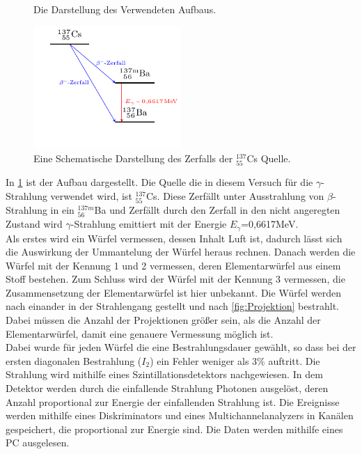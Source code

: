 \begin{figure}[h!]
\centering
\caption{Die Darstellung des Verwendeten Aufbaus.}\label{fig:Aufbau}
\end{figure}
\begin{figure}[h!]
	\centering
	\includegraphics[width = 0.5\textwidth]{../Grafiken/Tikz/tikz-Energieschema.pdf}
	\caption{Eine Schematische Darstellung des Zerfalls der ${}^{137}_{55}$Cs Quelle.}
\end{figure}
In \cref{fig:Aufbau} ist der Aufbau dargestellt.
Die Quelle die in diesem Versuch für die $\gamma$-Strahlung verwendet wird, ist ${}^{137}_{55}$Cs.
Diese Zerfällt unter Ausstrahlung von $\beta$-Strahlung in ein ${}^{137m}_{56}$Ba und Zerfällt durch den Zerfall in den nicht angeregten Zustand wird $\gamma$-Strahlung emittiert mit der Energie $E_\gamma$=0,6617MeV.\\
Als erstes wird ein Würfel vermessen, dessen Inhalt Luft ist, dadurch lässt sich die Auswirkung der Ummantelung der Würfel heraus rechnen.
Danach werden die Würfel mit der Kennung 1 und 2 vermessen, deren Elementarwürfel aus einem Stoff bestehen.
Zum Schluss wird der Würfel mit der Kennung 3 vermessen, die Zusammensetzung der Elementarwürfel ist hier unbekannt. 
Die Würfel werden nach einander in der Strahlengang gestellt und nach \cref{fig:Projektion} bestrahlt.
Dabei müssen die Anzahl der Projektionen größer sein, als die Anzahl der Elementarwürfel, damit eine genauere Vermessung möglich ist.\\
Dabei wurde für jeden Würfel die eine Bestrahlungsdauer gewählt, so dass bei der ersten diagonalen Bestrahlung ($I_2$) ein Fehler weniger als $3\%$ auftritt.
Die Strahlung wird mithilfe eines Szintillationsdetektors nachgewiesen.
In dem Detektor werden durch die einfallende Strahlung Photonen ausgelöst, deren Anzahl proportional zur Energie der einfallenden Strahlung ist.
Die Ereignisse werden mithilfe eines Diskriminators und eines Multichannelanalyzers in Kanälen gespeichert, die proportional zur Energie sind.
Die Daten werden mithilfe eines PC ausgelesen.